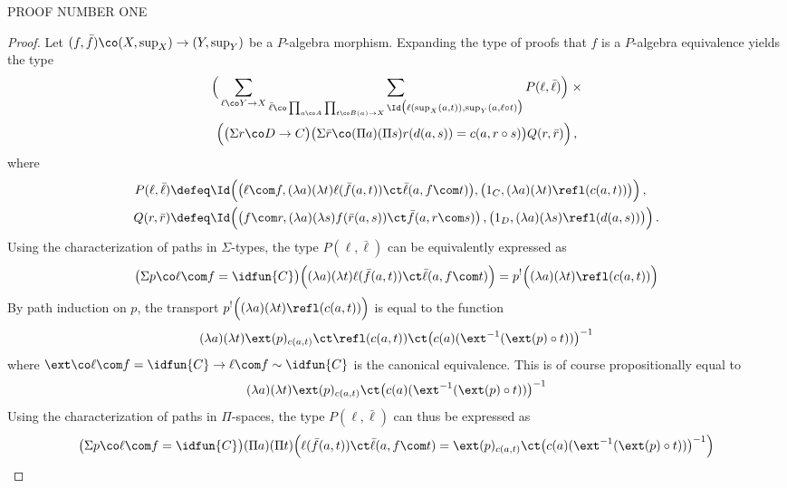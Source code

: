 PROOF NUMBER ONE


\begin{proof} Let $(f, \bar{f}) \co (X, \sup_X) \to (Y, \sup_Y)$ be a  $P$-algebra morphism. Expanding the type of proofs that $f$ is a 
$P$-algebra equivalence yields the type
\begin{multline*}
 \Big(
 \sum_{\ell \co Y \to X} \sum_{\bar{\ell} \co  \prod_{a \co A} \prod_{t \co B(a) \to X} \Id \big( \ell( \sup_X(a,t)) , \sup_Y(a, \ell \circ t) \big)}
 P(\ell,\bar{\ell})\Big) \; \times \\ 
 \Big(\big(\Sigma r \co D \to C \big) \big(\Sigma \bar{r} \co (\Pi a) (\Pi s) r(d(a,s))=c(a,r \circ s) \big) Q(r,\bar{r})  \Big)\, , 
\end{multline*}
where
\begin{align*}
P(\ell,\bar{\ell}) & \defeq \Id \Big( \big( \ell \com f, (\lambda a)(\lambda t) \ell(\bar{f}(a,t)) \ct \bar{\ell}(a, f \com t)\big), \big( 1_C, (\lambda a)(\lambda t) \refl(c(a,t))\big) \Big)  \, , \\
Q(r,\bar{r})    & \defeq \Id \Big( \big( f \com r, (\lambda a)(\lambda s) f(\bar{r}(a,s)) \ct \bar{f}(a, r \com s)\big) \, , \big( 1_D, (\lambda a)(\lambda s) \refl(d(a,s)) \big) \Big) \, .
\end{align*}
Using the characterization of paths in $\Sigma$-types, the type $P(\ell,\bar{\ell})$ can be equivalently expressed as
\begin{align*}
\big(\Sigma p \co \ell \com f = \idfun{C} \big) \Big((\lambda a) (\lambda t) \ell(\bar{f}(a,t)) \ct \bar{\ell}(a, f \com t)\Big) = p^{!} \Big((\lambda a) (\lambda t) \refl(c(a,t))\Big) 
\end{align*}
By path induction on $p$, the transport $p^{!} \Big((\lambda a) (\lambda t) \refl(c(a,t))\Big)$ is equal to the function
\[ (\lambda a) (\lambda t) \ext(p)_{c(a,t)} \ct \refl(c(a,t)) \ct \big(c(a)(\ext^{-1}(\ext(p) \circ t))\big)^{-1} \]
where $\ext \co \ell \com f = \idfun{C} \to \ell \com f \sim \idfun{C}$ is the canonical equivalence. This is of course propositionally equal to
\[ (\lambda a) (\lambda t) \ext(p)_{c(a,t)} \ct \big(c(a)(\ext^{-1}(\ext(p) \circ t))\big)^{-1} \]
Using the characterization of paths in $\Pi$-spaces, the type $P(\ell,\bar{\ell})$ can thus be expressed as
\begin{align*}
\big(\Sigma p \co \ell \com f = \idfun{C} \big) (\Pi a) (\Pi t) \Big(\ell(\bar{f}(a,t)) \ct \bar{\ell}(a, f \com t) = \ext(p)_{c(a,t)} \ct \big(c(a)(\ext^{-1}(\ext(p) \circ t))\big)^{-1}\Big)
\end{align*}

\end{proof}
